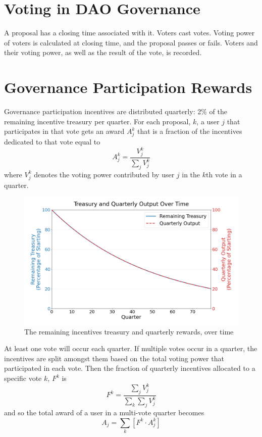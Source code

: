 \documentclass{article}
\begin{document}
\section{Voting in DAO Governance}\label{sec:voting}

A proposal has a closing time associated with it.
Voters cast votes.
Voting power of voters is calculated at closing time, and the proposal passes or fails.
Voters and their voting power, as well as the result of the vote, is recorded.

\section{Governance Participation Rewards}\label{sec:rewards}

Governance participation incentives are distributed quarterly: 2\% of the remaining incentive treasury per quarter.
For each proposal, $k$, a user $j$ that participates in that vote gets an award $A^{k}_j$ that is a fraction of the incentives dedicated to that vote equal to
\begin{equation}
A^{k}_j = \frac{V^{k}_j}{\sum_j V^{k}_j}
\end{equation}
where $V^{k}_j$ denotes the voting power contributed by user $j$ in the $k$th vote in a quarter.

\begin{figure}[h]
    \centering
    \includegraphics[width=\textwidth]{incentives-treasury-over-time.png}
    \caption{The remaining incentives treasury and quarterly rewards, over time}
    \label{fig:incentives}
\end{figure}

At least one vote will occur each quarter.
If multiple votes occur in a quarter, the incentives are split amongst them based on the total voting power that participated in each vote.
Then the fraction of quarterly incentives allocated to a specific vote $k$, $F^{k}$ is
\begin{equation}
F^{k} = \frac{\sum_j V^{k}_j}{\sum_k \sum_j V^{k}_j}
\end{equation}
and so the total award of a user in a multi-vote quarter becomes
\begin{equation}
A_j = \sum_k \left[F^{k} \cdot A^{k}_j\right]
\end{equation}
\end{document}
